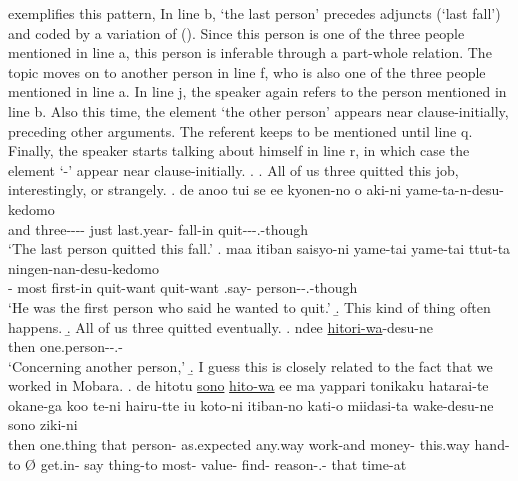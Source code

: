 \Next exemplifies this pattern,
In line b,  `the last person' precedes adjuncts (`last fall') and coded by a variation of  ().
Since this person is one of the three people mentioned in line a,
this person is inferable
through a part-whole relation.
The topic moves on to another person in line f, who is also one of the three people mentioned in line a.
In line j, the speaker again refers to the person mentioned in line b.
Also this time, the element  `the other person' appears near clause-initially, preceding other arguments.
The referent keeps to be mentioned until line q.
Finally, the speaker starts talking about himself in line r,
in which case the element  `-' appear near clause-initially.
%
\ex.
 \a. All of us three quitted this job, interestingly, or strangely.
 \bg. de anoo  tui se ee kyonen-no o aki-ni yame-ta-n-desu-kedomo \\
 	and  three---- just   last.year-  fall-in quit---.-though \\
	`The last person quitted this fall.'
 \bg.  maa itiban saisyo-ni yame-tai yame-tai ttut-ta ningen-nan-desu-kedomo \\
 		-  most first-in quit-want quit-want .say- person--.-though \\
		`He was the first person who said he wanted to quit.'
 \b. This kind of thing often happens.
 \b. All of us three quitted eventually.
 \bg. ndee \ul{hitori-wa}-desu-ne \\
 		then one.person--.- \\
		`Concerning another person,'
 \b. I guess this is closely related to the fact that we worked in Mobara.
 \bg. de hitotu \ul{sono} \ul{hito-wa} ee ma yappari tonikaku hatarai-te okane-ga koo te-ni \EM{\O} hairu-tte iu koto-ni itiban-no kati-o miidasi-ta wake-desu-ne sono ziki-ni \\
 		then one.thing that person- \ab{fl}  as.expected any.way work-and money- this.way hand-to {\O} get.in- say thing-to most- value- find- reason-.- that time-at \\
